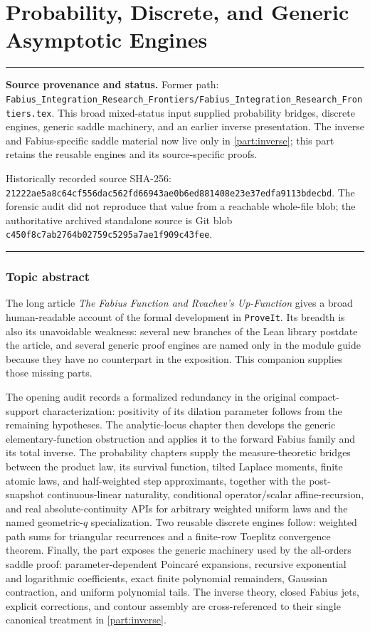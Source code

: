 \documentclass[11pt,oneside]{article}
\theoremstyle{definition}
\theoremstyle{remark}
\newenvironment{boxedremark}{%
  \par\smallskip\noindent\begin{center}\begin{minipage}{0.94\textwidth}%
  \color{black}\hrule\vspace{0.6em}\small
}{%
  \vspace{0.6em}\hrule\end{minipage}\end{center}\smallskip
}
\begin{document}
\part{Probability, Discrete, and Generic Asymptotic Engines}
\label{part:integration}
\begin{boxedremark}
\textbf{Source provenance and status.} Former path: \nolinkurl{Fabius_Integration_Research_Frontiers/Fabius_Integration_Research_Frontiers.tex}.  This broad mixed-status input supplied probability bridges, discrete engines, generic saddle machinery, and an earlier inverse presentation.  The inverse and Fabius-specific saddle material now live only in \cref{part:inverse}; this part retains the reusable engines and its source-specific proofs.\par\smallskip Historically recorded source SHA-256: \nolinkurl{21222ae5a8c64cf556dac562fd66943ae0b6ed881408e23e37edfa9113bdecbd}.  The forensic audit did not reproduce that value from a reachable whole-file blob; the authoritative archived standalone source is Git blob \nolinkurl{c450f8c7ab2764b02759c5295a7ae1f909c43fee}.
\end{boxedremark}
\section*{Topic abstract}
The long article \emph{The Fabius Function and Rvachev's Up-Function} gives a broad
human-readable account of the formal development in \texttt{ProveIt}.  Its breadth is also
its unavoidable weakness: several new branches of the Lean library postdate the article,
and several generic proof engines are named only in the module guide because they have no
counterpart in the exposition.  This companion supplies those missing parts.

The opening audit records a formalized redundancy in the original compact-support
characterization: positivity of its dilation parameter follows from the remaining
hypotheses.  The analytic-locus chapter then develops the generic elementary-function
obstruction and applies it to the forward Fabius family and its total inverse.  The
probability chapters supply the measure-theoretic bridges between the product law, its
survival function, tilted Laplace moments, finite atomic laws, and half-weighted step
approximants, together with the post-snapshot continuous-linear naturality, conditional
operator/scalar affine-recursion, and real absolute-continuity APIs for arbitrary weighted
uniform laws and the named geometric-\(q\) specialization.  Two reusable
discrete engines follow: weighted path sums for triangular
recurrences and a finite-row Toeplitz convergence theorem.  Finally, the part exposes the
generic machinery used by the all-orders saddle proof: parameter-dependent Poincar\'e
expansions, recursive exponential and logarithmic coefficients, exact finite polynomial
remainders, Gaussian contraction, and uniform polynomial tails.  The inverse theory,
closed Fabius jets, explicit corrections, and contour assembly are cross-referenced to their
single canonical treatment in \cref{part:inverse}.
\end{document}
